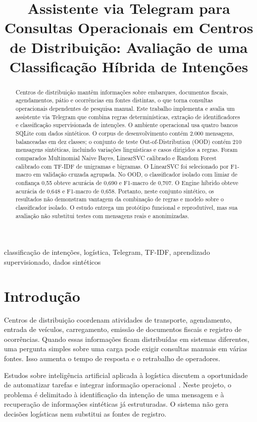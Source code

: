 \documentclass[conference]{IEEEtran}
\title{Assistente via Telegram para Consultas Operacionais em Centros de Distribuição: Avaliação de uma Classificação Híbrida de Intenções}
\author{
\IEEEauthorblockN{Daniel Domiciano Spindola, Gustavo de Oliveira Fusco e João Gabriel Coitinho Bonin}
\IEEEauthorblockA{Engenharia de Computação, Fundação Hermínio Ometto (FHO)\\
Araras, Brasil\\
RA: 115562, 115220 e 115872}
}
\begin{document}
\maketitle

\begin{abstract}
Centros de distribuição mantêm informações sobre embarques, documentos fiscais, agendamentos, pátio e ocorrências em fontes distintas, o que torna consultas operacionais dependentes de pesquisa manual. Este trabalho implementa e avalia um assistente via Telegram que combina regras determinísticas, extração de identificadores e classificação supervisionada de intenções. O ambiente operacional usa quatro bancos SQLite com dados sintéticos. O corpus de desenvolvimento contém 2.000 mensagens, balanceadas em dez classes; o conjunto de teste Out-of-Distribution (OOD) contém 210 mensagens sintéticas, incluindo variações linguísticas e casos dirigidos a regras. Foram comparados Multinomial Naive Bayes, LinearSVC calibrado e Random Forest calibrado com TF-IDF de unigramas e bigramas. O LinearSVC foi selecionado por F1-macro em validação cruzada agrupada. No OOD, o classificador isolado com limiar de confiança 0,55 obteve acurácia de 0,690 e F1-macro de 0,707. O Engine híbrido obteve acurácia de 0,648 e F1-macro de 0,658. Portanto, neste conjunto sintético, os resultados não demonstram vantagem da combinação de regras e modelo sobre o classificador isolado. O estudo entrega um protótipo funcional e reprodutível, mas sua avaliação não substitui testes com mensagens reais e anonimizadas.
\end{abstract}

\begin{IEEEkeywords}
classificação de intenções, logística, Telegram, TF-IDF, aprendizado supervisionado, dados sintéticos
\end{IEEEkeywords}

\section{Introdução}

Centros de distribuição coordenam atividades de transporte, agendamento, entrada de veículos, carregamento, emissão de documentos fiscais e registro de ocorrências. Quando essas informações ficam distribuídas em sistemas diferentes, uma pergunta simples sobre uma carga pode exigir consultas manuais em várias fontes. Isso aumenta o tempo de resposta e o retrabalho de operadores.

Estudos sobre inteligência artificial aplicada à logística discutem a oportunidade de automatizar tarefas e integrar informação operacional \cite{klumpp}. Neste projeto, o problema é delimitado à identificação da intenção de uma mensagem e à recuperação de informações sintéticas já estruturadas. O sistema não gera decisões logísticas nem substitui as fontes de registro.
\end{document}
